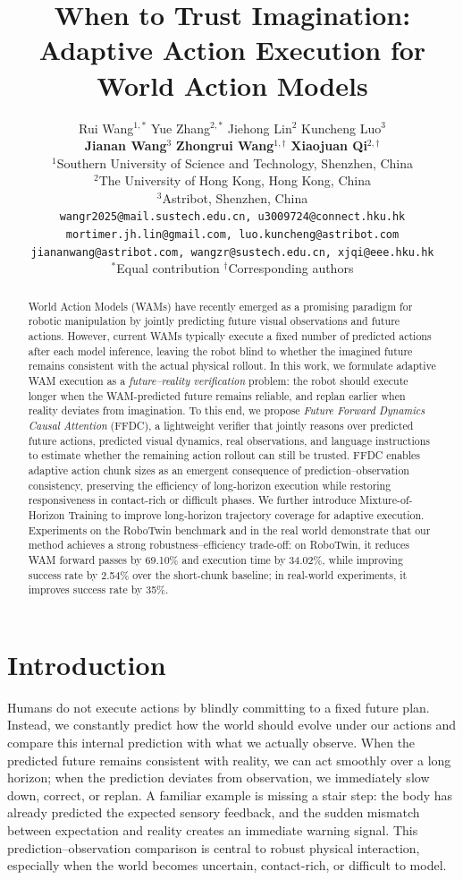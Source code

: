 \documentclass{article}
\title{When to Trust Imagination: Adaptive Action Execution for World Action Models}
\author{
Rui Wang$^{1,*}$ \quad
Yue Zhang$^{2,*}$ \quad
Jiehong Lin$^2$ \quad
Kuncheng Luo$^3$ \\
\textbf{Jianan Wang}$^3$ \quad
\textbf{Zhongrui Wang}$^{1,\dagger}$ \quad
\textbf{Xiaojuan Qi}$^{2,\dagger}$ \\
$^1$Southern University of Science and Technology, Shenzhen, China \\
$^2$The University of Hong Kong, Hong Kong, China \\
$^3$Astribot, Shenzhen, China \\
\texttt{wangr2025@mail.sustech.edu.cn, u3009724@connect.hku.hk} \\
\texttt{mortimer.jh.lin@gmail.com, luo.kuncheng@astribot.com} \\
\texttt{jiananwang@astribot.com, wangzr@sustech.edu.cn, xjqi@eee.hku.hk} \\
$^*$Equal contribution \qquad $^\dagger$Corresponding authors
}
\begin{document}
\maketitle

\begin{abstract}
World Action Models (WAMs) have recently emerged as a promising paradigm for robotic manipulation by jointly predicting future visual observations and future actions. However, current WAMs typically execute a fixed number of predicted actions after each model inference, leaving the robot blind to whether the imagined future remains consistent with the actual physical rollout. In this work, we formulate adaptive WAM execution as a \emph{future--reality verification} problem: the robot should execute longer when the WAM-predicted future remains reliable, and replan earlier when reality deviates from imagination. To this end, we propose \emph{Future Forward Dynamics Causal Attention} (FFDC), a lightweight verifier that jointly reasons over predicted future actions, predicted visual dynamics, real observations, and language instructions to estimate whether the remaining action rollout can still be trusted. FFDC enables adaptive action chunk sizes as an emergent consequence of prediction--observation consistency, preserving the efficiency of long-horizon execution while restoring responsiveness in contact-rich or difficult phases. We further introduce Mixture-of-Horizon Training to improve long-horizon trajectory coverage for adaptive execution. Experiments on the RoboTwin benchmark and in the real world demonstrate that our method achieves a strong robustness--efficiency trade-off: on RoboTwin, it reduces WAM forward passes by 69.10\% and execution time by 34.02\%, while improving success rate by 2.54\% over the short-chunk baseline; in real-world experiments, it improves success rate by 35\%.

\end{abstract}

\section{Introduction}
\label{sec:introduction}


Humans do not execute actions by blindly committing to a fixed future plan. Instead, we constantly predict how the world should evolve under our actions and compare this internal prediction with what we actually observe. When the predicted future remains consistent with reality, we can act smoothly over a long horizon; when the prediction deviates from observation, we immediately slow down, correct, or replan. A familiar example is missing a stair step: the body has already predicted the expected sensory feedback, and the sudden mismatch between expectation and reality creates an immediate warning signal. This prediction--observation comparison is central to robust physical interaction, especially when the world becomes uncertain, contact-rich, or difficult to model.
\end{document}
